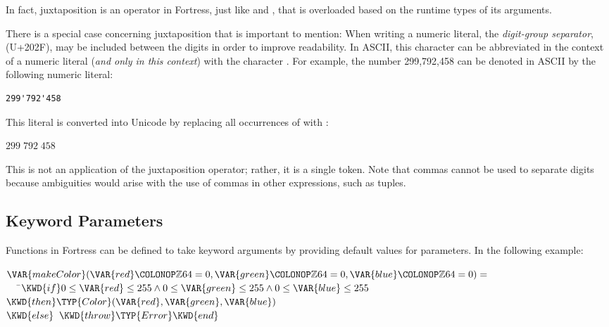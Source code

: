 

In fact, juxtaposition is an operator in Fortress,
just like \EXP{+} and \EXP{-},
that is overloaded based on the runtime types of its arguments.

There is a special case concerning juxtaposition that is important to mention:
When writing a numeric literal, the \emph{digit-group separator},
 (U+202F),
may be included between the digits in order to improve readability.
In ASCII,
this character can be abbreviated in the context of a numeric literal
(\emph{and only in this context}) with the character .
For example, the number 299,792,458 can be denoted in ASCII by the
following numeric literal:

\begin{verbatim}
299'792'458
\end{verbatim}

This literal is converted into Unicode by replacing all occurrences of
 with :
\begin{Fortress}
\(299{}\;792{}\;458\)
\end{Fortress}
This is not an application of the juxtaposition operator;
rather, it is a single token.
Note that commas cannot be used to separate digits because ambiguities
would arise with the use of commas in other expressions,
such as tuples.

\subsection{Keyword Parameters}

Functions in Fortress can be defined to take keyword arguments by
providing default values for parameters. In
the following example:

\begin{Fortress}
\(\VAR{makeColor}(\VAR{red}\COLONOP\mathbb{Z}64 = 0, \VAR{green}\COLONOP\mathbb{Z}64 = 0, \VAR{blue}\COLONOP\mathbb{Z}64 = 0) =\)\\
{\tt~~~}\pushtabs\=\+\(   \KWD{if} 0 \leq \VAR{red} \leq 255 \wedge 0 \leq \VAR{green} \leq 255 \wedge 0 \leq \VAR{blue} \leq 255 \)\\
\(   \KWD{then} \TYP{Color}(\VAR{red},\VAR{green},\VAR{blue})\)\\
\(   \KWD{else}\;\;\KWD{throw} \TYP{Error} \KWD{end}\)\-\\\poptabs
\end{Fortress}

